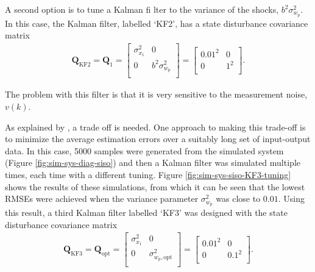 A second option is to tune a Kalman fi lter to the variance of the shocks, $b^2\sigma_{w_p}^2$.  In this case, the Kalman filter, labelled `KF2', has a state disturbance covariance matrix
\begin{equation} \label{eq:sim-sys-siso-KF2-Q}
	\begin{aligned}
		\mathbf{Q}_{\text{KF2}}=\mathbf{Q}_1=\begin{bmatrix}
			\sigma_{x_1}^2 & 0 \\
			0 & b^2\sigma_{w_p}^2 \\
		\end{bmatrix}=\begin{bmatrix}
			0.01^2 & 0 \\
			0 & 1^2 \\
		\end{bmatrix}.
	\end{aligned}
\end{equation}

The problem with this filter is that it is very sensitive to the measurement noise, $v(k)$. 

As explained by \cite{robertson_detection_1995}, a trade off is needed. One approach to making this trade-off is to minimize the average estimation errors over a suitably long set of input-output data. In this case, 5000 samples were generated from the simulated system (Figure \ref{fig:sim-sys-diag-siso}) and then a Kalman filter was simulated multiple times, each time with a different tuning. Figure \ref{fig:sim-sys-siso-KF3-tuning} shows the results of these simulations, from which it can be seen that the lowest \gls{RMSE}s were achieved when the variance parameter $\sigma_{w_p}^2$ was close to $0.01$. Using this result, a third Kalman filter labelled `KF3' was designed with the state disturbance covariance matrix 
\begin{equation} \label{eq:sim-sys-siso-KF3-Q}
	\begin{aligned}
		\mathbf{Q}_{\text{KF3}}=\mathbf{Q}_{\text{opt}}=\begin{bmatrix}
			\sigma_{x_1}^2 & 0 \\
			0 & \sigma_{w_p,\text{opt}}^2 \\
		\end{bmatrix}=\begin{bmatrix}
			0.01^2 & 0 \\
			0 & 0.1^2 \\
		\end{bmatrix}.
	\end{aligned}
\end{equation}

